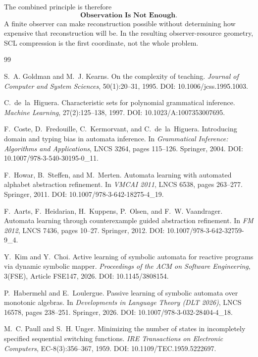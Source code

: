 \documentclass[11pt]{article}
\theoremstyle{definition}
\theoremstyle{remark}
\begin{document}
The combined principle is therefore
\[
 \boxed{\textbf{Observation Is Not Enough}.}
\]
A finite observer can make reconstruction possible without determining how
expensive that reconstruction will be.  In the resulting observer-resource
geometry, SCL compression is the first coordinate, not the whole problem.

\begin{thebibliography}{99}

S.~A. Goldman and M.~J. Kearns.
\newblock On the complexity of teaching.
\newblock \emph{Journal of Computer and System Sciences}, 50(1):20--31, 1995.
\newblock DOI: 10.1006/jcss.1995.1003.

C.~de~la~Higuera.
\newblock Characteristic sets for polynomial grammatical inference.
\newblock \emph{Machine Learning}, 27(2):125--138, 1997.
\newblock DOI: 10.1023/A:1007353007695.

F.~Coste, D.~Fredouille, C.~Kermorvant, and C.~de~la~Higuera.
\newblock Introducing domain and typing bias in automata inference.
\newblock In \emph{Grammatical Inference: Algorithms and Applications},
LNCS 3264, pages 115--126. Springer, 2004.
\newblock DOI: 10.1007/978-3-540-30195-0\_11.

F.~Howar, B.~Steffen, and M.~Merten.
\newblock Automata learning with automated alphabet abstraction refinement.
\newblock In \emph{VMCAI 2011}, LNCS 6538, pages 263--277. Springer, 2011.
\newblock DOI: 10.1007/978-3-642-18275-4\_19.

F.~Aarts, F.~Heidarian, H.~Kuppens, P.~Olsen, and F.~W. Vaandrager.
\newblock Automata learning through counterexample guided abstraction refinement.
\newblock In \emph{FM 2012}, LNCS 7436, pages 10--27. Springer, 2012.
\newblock DOI: 10.1007/978-3-642-32759-9\_4.

Y.~Kim and Y.~Choi.
\newblock Active learning of symbolic automata for reactive programs via dynamic symbolic mapper.
\newblock \emph{Proceedings of the ACM on Software Engineering}, 3(FSE), Article FSE147, 2026.
\newblock DOI: 10.1145/3808154.

P.~Habermehl and E.~Loulergue.
\newblock Passive learning of symbolic automata over monotonic algebras.
\newblock In \emph{Developments in Language Theory (DLT 2026)}, LNCS 16578,
pages 238--251. Springer, 2026.
\newblock DOI: 10.1007/978-3-032-28404-4\_18.

M.~C. Paull and S.~H. Unger.
\newblock Minimizing the number of states in incompletely specified sequential switching functions.
\newblock \emph{IRE Transactions on Electronic Computers}, EC-8(3):356--367, 1959.
\newblock DOI: 10.1109/TEC.1959.5222697.


\end{thebibliography}
\end{document}
